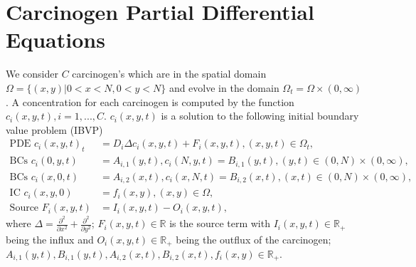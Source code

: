 \documentclass[\main/thesis.tex]{subfiles}
\begin{document}
\section{Carcinogen Partial Differential Equations}
We consider $C$ carcinogen's which are in the spatial domain \newline
$\Omega {=} \{ (x, y) | 0 {<} x {<} N, 0 {<} y {<} N \}$ and evolve in the domain $\Omega_t {=} \Omega {\times} (0, \infty)$.\newline
A concentration for each carcinogen is computed by the function \newline
$c_i(x, y, t), i=1, ..., C$. $c_i(x, y, t)$ is a solution to the following initial boundary value problem (IBVP)
\begin{align}
\text{PDE } c_i(x, y, t)_t &{=} D_i\Delta c_i(x, y, t) {+} F_i(x, y, t), (x, y, t) {\in} \Omega_t,
\label{eq:carcin_pde_inhomo} \\
\text{BCs } c_i(0, y, t) &{=} A_{i, 1}(y, t), c_i(N, y, t) {=} B_{i, 1}(y, t), (y, t) {\in} (0, N) {\times} (0, \infty),
\label{eq:bcs_inhomo_x} \\
\text{BCs } c_i(x, 0, t) &{=} A_{i, 2}(x, t), c_i(x, N, t) {=} B_{i, 2}(x, t), (x, t) {\in} (0, N) {\times} (0, \infty),
\label{eq:bcs_inhomo_y} \\
\text{IC } c_i(x, y, 0) &{=} f_i(x, y), (x, y) {\in} \Omega,
\label{eq:ic_inhomo} \\
\text{Source } F_i(x, y, t) &{=} I_i(x, y, t) {-} O_i(x, y, t),
\label{eq:source_term}
\end{align}
where $\Delta {=} \frac{\partial^2}{\partial x^2} + \frac{\partial^2}{\partial y^2}$; $F_i(x, y, t) {\in} \mathbb{R}$ is the source term with $I_i(x, y, t) {\in} \mathbb{R}_+$ being the influx and 
$O_i(x, y, t) {\in} \mathbb{R}_+$ being the outflux of the carcinogen; \\ $A_{i, 1}(y, t), B_{i, 1}(y, t), A_{i, 2}(x, t), B_{i, 2}(x, t), f_i(x, y) {\in} \mathbb{R}_+$.  
\end{document}
